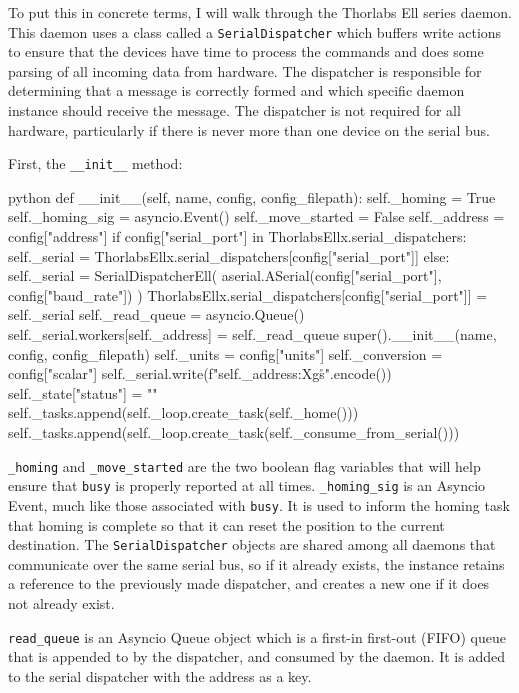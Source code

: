 To put this in concrete terms, I will walk through the Thorlabs Ell series daemon.
This daemon uses a class called a \texttt{SerialDispatcher} which buffers write actions to ensure that the devices have time to process the commands and does some parsing of all incoming data from hardware.
The dispatcher is responsible for determining that a message is correctly formed and which specific daemon instance should receive the message.
The dispatcher is not required for all hardware, particularly if there is never more than one device on the serial bus.

First, the \texttt{\_\_init\_\_} method:

\begin{codefragment}{python}
def __init__(self, name, config, config_filepath):
    self._homing = True
    self._homing_sig = asyncio.Event()
    self._move_started = False
    self._address = config["address"]
    if config["serial_port"] in ThorlabsEllx.serial_dispatchers:
        self._serial = ThorlabsEllx.serial_dispatchers[config["serial_port"]]
    else:
        self._serial = SerialDispatcherEll(
            aserial.ASerial(config["serial_port"], config["baud_rate"])
        )
        ThorlabsEllx.serial_dispatchers[config["serial_port"]] = self._serial
    self._read_queue = asyncio.Queue()
    self._serial.workers[self._address] = self._read_queue
    super().__init__(name, config, config_filepath)
    self._units = config["units"]
    self._conversion = config["scalar"]
    self._serial.write(f"{self._address:X}gs\r\n".encode())
    self._state["status"] = ""
    self._tasks.append(self._loop.create_task(self._home()))
    self._tasks.append(self._loop.create_task(self._consume_from_serial()))
\end{codefragment}

\texttt{\_homing} and \texttt{\_move\_started} are the two boolean flag variables that will help ensure that \texttt{busy} is properly reported at all times.
\texttt{\_homing\_sig} is an Asyncio Event, much like those associated with \texttt{busy}.
It is used to inform the homing task that homing is complete so that it can reset the position to the current destination.
The \texttt{SerialDispatcher} objects are shared among all daemons that communicate over the same serial bus, so if it already exists, the instance retains a reference to the previously made dispatcher, and creates a new one if it does not already exist.

\texttt{read\_queue} is an Asyncio Queue\cite{asyncioqueue} object which is a first-in first-out (FIFO) queue that is appended to by the dispatcher, and consumed by the daemon.
It is added to the serial dispatcher with the address as a key.

